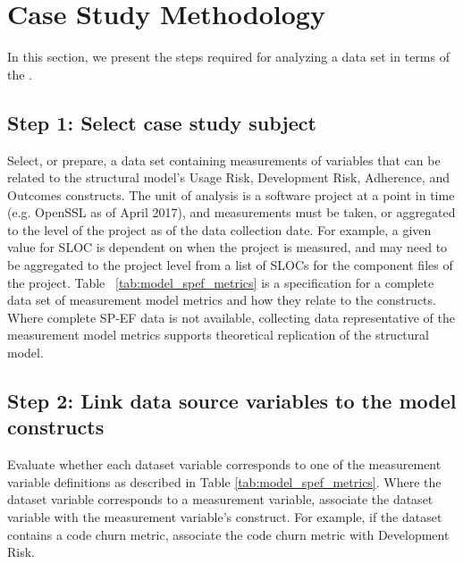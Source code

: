 \section{Case Study Methodology}
\label{sec:methodology}
In this section, we present the steps required for analyzing a data set in terms of the \ModelAbbr.

\subsection{Step 1: Select case study subject}
Select, or prepare, a data set containing measurements of  variables that can be related to the structural model's Usage Risk, Development Risk, Adherence, and Outcomes constructs. The unit of analysis is a software project at a point in time (e.g. OpenSSL as of April 2017), and measurements must be taken, or aggregated to the level of the project as of the data collection date. For example, a given value for SLOC is dependent on when the project is measured, and may need to be aggregated to the project level from a list of SLOCs for the component files of the project. Table ~\ref{tab:model_spef_metrics} is a specification for a complete data set of measurement model metrics and how they relate to the constructs. Where complete SP-EF data is not available, collecting data representative of the measurement model metrics supports theoretical replication of the structural model.     

\subsection{Step 2: Link data source variables to the model constructs}
Evaluate whether each dataset variable corresponds to one of the measurement variable definitions as described in Table \ref{tab:model_spef_metrics}. Where the dataset variable corresponds to a measurement variable, associate the dataset variable with the measurement variable's construct. For example, if the dataset contains a code churn metric, associate the code churn metric with Development Risk.

